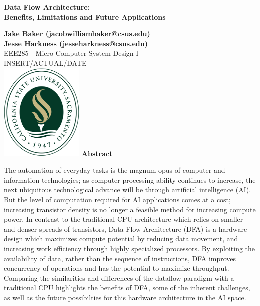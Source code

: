 \begin{titlepage}
    \begin{center}
        \vspace*{-20mm}
        \huge
        \textbf{Data Flow Architecture:\\ \vspace{-3mm} Benefits, Limitations and Future Applications}\\
         \large
        
        \vspace{0.3 cm}
        \textbf{
        Jake Baker (jacobwilliambaker@csus.edu) \\
        \vspace{-2mm}
        Jesse Harkness (jesseharkness@csus.edu)} \\ 
        \vspace{-2mm}
        EEE285 - Micro-Computer System Design I \\
        \vspace{-2mm}
        INSERT/ACTUAL/DATE\\
        \vspace{10mm}
        \includegraphics[width=0.3\textwidth]{Picture Files/1200px-California_State_University,_Sacramento_seal.svg.png}
        \vfill
        \textbf{Abstract}\\
        \raggedright\setlength{\parindent}{3em}
        The automation of everyday tasks is the magnum opus of computer and information technologies; as computer processing ability continues to increase, the next ubiquitous technological advance will be through artificial intelligence (AI).  But the level of computation required for AI applications comes at a cost; increasing transistor density is no longer a feasible method for increasing compute power.  In contrast to the traditional CPU architecture which relies on smaller and denser spreads of transistors, Data Flow Architecture (DFA) is a hardware design which maximizes compute potential by reducing data movement, and increasing work efficiency through highly specialized processors.  By exploiting the availability of data, rather than the sequence of instructions, DFA improves concurrency of operations and has the potential to maximize throughput.  Comparing the similarities and differences of the dataflow paradigm with a traditional CPU highlights the benefits of DFA, some of the inherent challenges, as well as the future possibilties for this hardware architecture in the AI space.     
\par


    \end{center}
\end{titlepage}